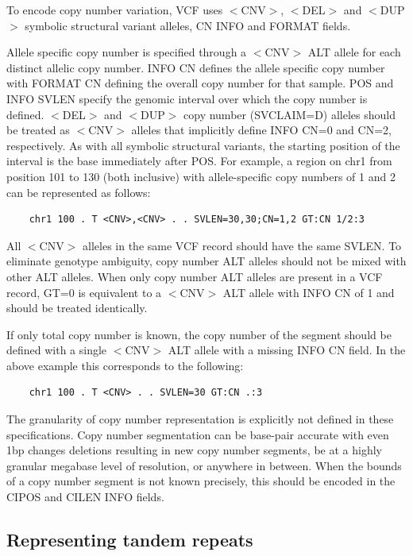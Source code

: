 \documentclass[8pt]{article}
\begin{document}
To encode copy number variation, VCF uses $<$CNV$>$, $<$DEL$>$ and $<$DUP$>$ symbolic structural variant alleles, CN INFO and FORMAT fields.

Allele specific copy number is specified through a $<$CNV$>$ ALT allele for each distinct allelic copy number.
INFO CN defines the allele specific copy number with FORMAT CN defining the overall copy number for that sample.
POS and INFO SVLEN specify the genomic interval over which the copy number is defined.
$<$DEL$>$ and $<$DUP$>$ copy number (SVCLAIM=D) alleles should be treated as $<$CNV$>$ alleles that implicitly define INFO CN=0 and CN=2, respectively.
As with all symbolic structural variants, the starting position of the interval is the base immediately after POS.
For example, a region on chr1 from position 101 to 130 (both inclusive) with allele-specific copy numbers of 1 and 2 can be represented as follows:

\footnotesize
\begin{verbatim}
	chr1 100 . T <CNV>,<CNV> . . SVLEN=30,30;CN=1,2 GT:CN 1/2:3
\end{verbatim}
\normalsize

All $<$CNV$>$ alleles in the same VCF record should have the same SVLEN.
To eliminate genotype ambiguity, copy number ALT alleles should not be mixed with other ALT alleles.
When only copy number ALT alleles are present in a VCF record, GT=0 is equivalent to a $<$CNV$>$ ALT allele with INFO CN of 1 and should be treated identically.

If only total copy number is known, the copy number of the segment should be defined with a single $<$CNV$>$ ALT allele with a missing INFO CN field.
In the above example this corresponds to the following:

\footnotesize
\begin{verbatim}
	chr1 100 . T <CNV> . . SVLEN=30 GT:CN .:3
\end{verbatim}
\normalsize

The granularity of copy number representation is explicitly not defined in these specifications.
Copy number segmentation can be base-pair accurate with even 1bp changes deletions resulting in new copy number segments, be at a highly granular megabase level of resolution, or anywhere in between.
When the bounds of a copy number segment is not known precisely, this should be encoded in the CIPOS and CILEN INFO fields.

\pagebreak
\subsection{Representing tandem repeats}
\label{tandem-repeats}
\end{document}
